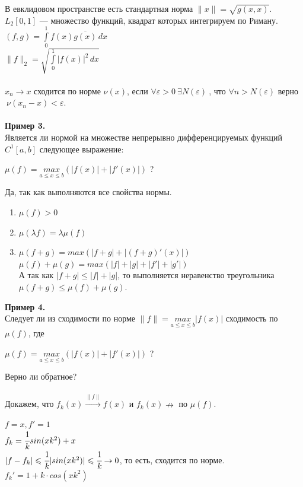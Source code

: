 \documentclass[12pt]{article}
\theoremstyle{definition}
\numberwithin{equation}{section}
\begin{document}
	В евклидовом пространстве есть стандартная норма $\parallel x \parallel = \sqrt{g(x, x)}$.\\
	$L_2[0, 1]$ --- множество функций, квадрат которых интегрируем по Риману.\\
	$(f, g) = \int\limits_0^1 f(x) \overline{g(x)}\,dx$\\
	$\parallel f \parallel_2 = \sqrt{\int\limits_0^1 |f(x)|^2\,dx}$\\
	\\
	$x_n \to x$ $\textbf{сходится по норме}$ $\nu(x)$, если $\forall \varepsilon > 0 ~ \exists N(\varepsilon)~$, что $\forall n > N(\varepsilon)$ верно $~\nu(x_n - x) < \varepsilon$.\\ \\
	\textbf{Пример 3.}\\
	Является ли нормой на множестве непрерывно дифференцируемых функций $C^1[a, b]$ следующее выражение: \begin{center}$\mu(f) = \underset{a \leqslant x \leqslant b}{max}(|f(x)|+|f'(x)|)$ ?\end{center}
	Да, так как выполняются все свойства нормы.\begin{enumerate}
		\item $\mu(f) > 0$
		\item $\mu(\lambda f) = \lambda \mu(f)$
		\item $\mu(f+g) = max(|f+g|+|(f+g)'(x)|)$\\
		$\mu(f)+\mu(g) = max(|f|+|g|+|f'|+|g'|)$\\
		А так как $|f+g|\leqslant |f|+|g|$, то выполняется неравенство треугольника \\$\mu(f+g) \leqslant \mu(f) + \mu(g)$.\end{enumerate}
	\textbf{Пример 4.}\\ Следует ли из сходимости по норме $\parallel f \parallel = \underset{a \leqslant x \leqslant b}{max} |f(x)|$ сходимость по $\mu(f)$, где \begin{center}$\mu(f) = \underset{a \leqslant x \leqslant b}{max}(|f(x)|+|f'(x)|)$ ?\end{center} Верно ли обратное?\\ \\
	Докажем, что $f_k(x) \overset{\parallel f \parallel}{\rightarrow} f(x)$ и $f_k(x) \nrightarrow$ по $\mu(f)$.
	\begin{center}
		$f = x, f' = 1$\\
		$f_k = \cfrac{1}{k}sin(xk^2)+x$\\
		$|f-f_k| \leqslant \cfrac{1}{k} |sin(xk^2)| \leqslant \cfrac{1}{k} \to 0$, то есть, сходится по норме.\\
		$f_k' = 1+k \cdot cos(xk^2)$\end{center}
\end{document}
